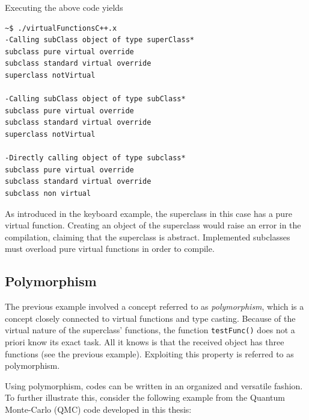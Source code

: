 Executing the above code yields

\begin{verbatim}
~$ ./virtualFunctionsC++.x 
-Calling subClass object of type superClass*
subclass pure virtual override
subclass standard virtual override
superclass notVirtual

-Calling subClass object of type subClass*
subclass pure virtual override
subclass standard virtual override
superclass notVirtual

-Directly calling object of type subclass*
subclass pure virtual override
subclass standard virtual override
subclass non virtual
\end{verbatim}

As introduced in the keyboard example, the superclass in this case has a pure virtual function. Creating an object of the superclass would raise an error in the compilation, claiming that the superclass is abstract. Implemented subclasses must overload pure virtual functions in order to compile.


\subsection{Polymorphism}
\label{sec:typeCastPoly}

The previous example involved a concept referred to as \textit{polymorphism}, which is a concept closely connected to virtual functions and type casting. Because of the virtual nature of the superclass' functions, the function \verb+testFunc()+ does not a priori know its exact task. All it knows is that the received object has three functions (see the previous example). Exploiting this property is referred to as polymorphism.

Using polymorphism, codes can be written in an organized and versatile fashion. To further illustrate this, consider the following example from the Quantum Monte-Carlo (QMC) code developed in this thesis:

